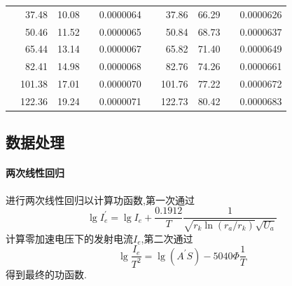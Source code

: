 \documentclass[UTF8,a4paper]{article}%
\begin{document}
\begin{table}[H]
\begin{tabular}{|r|r|r|r|r||r|r|r|r|r|}
                              & 37.48               & 10.08                            &                          & 0.0000064                    &                       & 37.86               & 66.29                            &                          & 0.0000626                    \\
                              & 50.46               & 11.52                            &                          & 0.0000065                    &                       & 50.84               & 68.73                            &                          & 0.0000637                    \\
                              & 65.44               & 13.14                            &                          & 0.0000067                    &                       & 65.82               & 71.40                            &                          & 0.0000649                    \\
                              & 82.41               & 14.98                            &                          & 0.0000068                    &                       & 82.76               & 74.26                            &                          & 0.0000661                    \\
                              & 101.38              & 17.01                            &                          & 0.0000070                    &                       & 101.76              & 77.22                            &                          & 0.0000672                    \\
                              & 122.36              & 19.24                            &                          & 0.0000071                    &                       & 122.73              & 80.42                            &                          & 0.0000683                    \\ \hline
    \end{tabular}
\end{table}
\subsection{数据处理}
\paragraph{两次线性回归}
进行两次线性回归以计算功函数,第一次通过
$$\lg I_e^\prime=\lg I_e + \frac{0.1912}{T}\frac{1}{\sqrt{r_k \ln(r_a/r_k)}\sqrt{U_a}}$$
计算零加速电压下的发射电流$I_e$,第二次通过
$$\lg{\frac{I_e}{T^2}}=\lg(A^\prime S)-5040\Phi\frac{1}{T}$$
得到最终的功函数.
\end{document}

